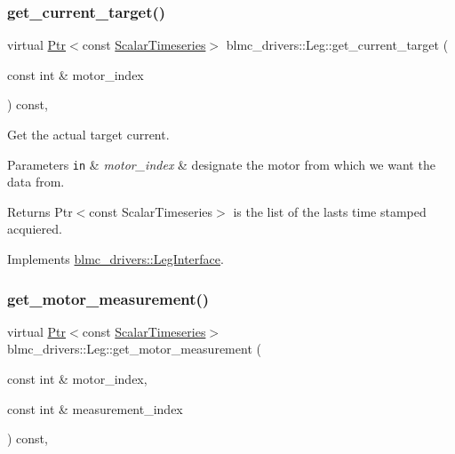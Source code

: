 \subsubsection{\texorpdfstring{get\+\_\+current\+\_\+target()}{get\_current\_target()}}
{\footnotesize\ttfamily virtual \hyperlink{classblmc__drivers_1_1LegInterface_ac5af9e6514abff5ee918813925a8e42d}{Ptr}$<$const \hyperlink{classblmc__drivers_1_1LegInterface_a57a35b64a76fb4225637828d1b1c35a6}{Scalar\+Timeseries}$>$ blmc\+\_\+drivers\+::\+Leg\+::get\+\_\+current\+\_\+target (\begin{DoxyParamCaption}\item[{const int \&}]{motor\+\_\+index }\end{DoxyParamCaption}) const\hspace{0.3cm}{\ttfamily [inline]}, {\ttfamily [virtual]}}



Get the actual target current. 


\begin{DoxyParams}[1]{Parameters}
\mbox{\tt in}  & {\em motor\+\_\+index} & designate the motor from which we want the data from. \\
\hline
\end{DoxyParams}
\begin{DoxyReturn}{Returns}
Ptr$<$const Scalar\+Timeseries$>$ is the list of the lasts time stamped acquiered. 
\end{DoxyReturn}


Implements \hyperlink{classblmc__drivers_1_1LegInterface_a44bac5c9a6015f0e08370b3bc9957512}{blmc\+\_\+drivers\+::\+Leg\+Interface}.

\mbox{\label{classblmc__drivers_1_1Leg_a52fe5c7cc7ad0242a481d969f5b2ff54}} 
\subsubsection{\texorpdfstring{get\+\_\+motor\+\_\+measurement()}{get\_motor\_measurement()}}
{\footnotesize\ttfamily virtual \hyperlink{classblmc__drivers_1_1LegInterface_ac5af9e6514abff5ee918813925a8e42d}{Ptr}$<$const \hyperlink{classblmc__drivers_1_1LegInterface_a57a35b64a76fb4225637828d1b1c35a6}{Scalar\+Timeseries}$>$ blmc\+\_\+drivers\+::\+Leg\+::get\+\_\+motor\+\_\+measurement (\begin{DoxyParamCaption}\item[{const int \&}]{motor\+\_\+index,  }\item[{const int \&}]{measurement\+\_\+index }\end{DoxyParamCaption}) const\hspace{0.3cm}{\ttfamily [inline]}, {\ttfamily [virtual]}}



